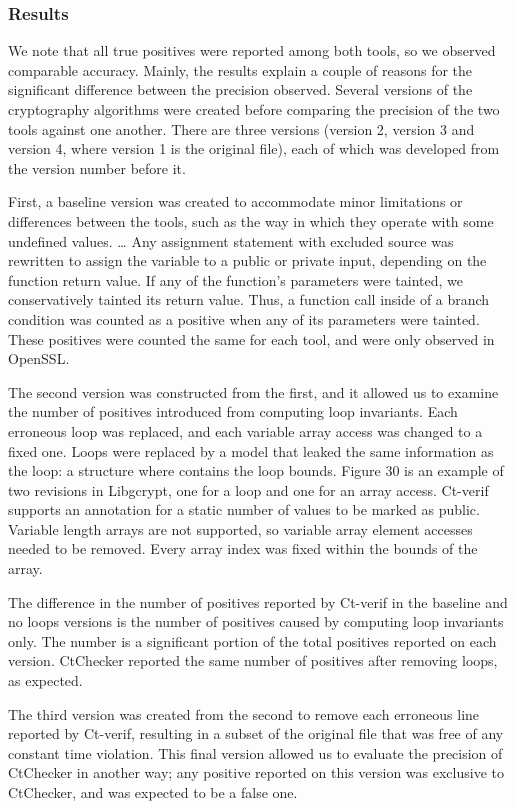 \subsubsection{Results}
We note that all true positives were reported among both tools, so we
observed comparable accuracy.  Mainly, the results explain a couple of
reasons for the significant difference between the precision observed.
Several versions of the  cryptography algorithms were created before
comparing the precision of the two tools against one another.  There
are three versions (version 2, version 3 and version 4, where version
1 is the original file), each of which was developed from the version
number before it.

First, a baseline version was created to accommodate minor limitations
or differences between the tools, such as the way in which they operate
with some undefined values. … Any assignment statement with excluded
source was rewritten to assign the variable to a public or private
input, depending on the function return value. If any of the function’s
parameters were tainted, we conservatively tainted its return value.
Thus, a function call inside of a branch condition was counted as a
positive when any of its parameters were tainted. These positives were
counted the same for each tool, and were only observed in OpenSSL.

The second version was constructed from the first, and it allowed us to
examine the number of positives introduced from computing loop invariants.
Each erroneous loop was replaced, and each variable array access was
changed to a fixed one. Loops were replaced by a model that leaked the
same information as the loop: a  structure where
 contains the loop bounds. Figure 30 is an example of two
revisions in Libgcrypt, one for a loop and one for an array access.
Ct-verif supports an annotation for a static number of values to be
marked as public.  Variable length arrays are not supported, so variable
array element accesses needed to be removed. Every array index was fixed
within the bounds of the array.

The difference in the number of positives reported by Ct-verif in the
baseline and no loops versions is the number of positives caused by
computing loop invariants only.  The number is a significant portion
of the total positives reported on each version. CtChecker reported the
same number of positives after removing loops, as expected.

The third version was created from the second to remove each erroneous
line reported by Ct-verif, resulting in a subset of the original file
that was free of any constant time violation. This final version allowed
us to evaluate the precision of CtChecker in another way; any positive
reported on this version was exclusive to CtChecker, and was expected
to be a false one.

